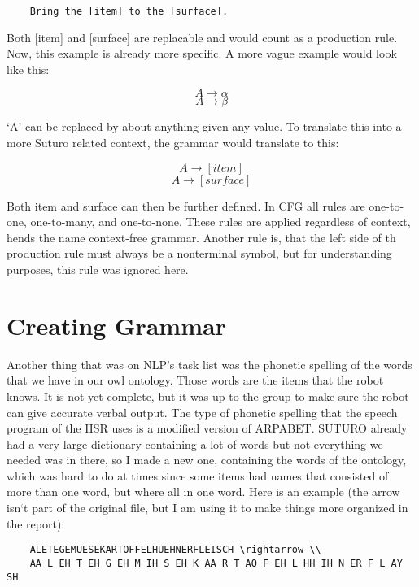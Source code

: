 \documentclass[main.tex]{subfiles}
\begin{document}
	\begin{verbatim}
	Bring the [item] to the [surface].
	\end{verbatim}
	
	Both [item] and [surface] are replacable and would count as a production rule. Now, this example is already more specific. A more vague example would look like this:
	
	\begin{equation}
	A \rightarrow \alpha
	\end{equation}
	\begin{equation}
	A \rightarrow \beta
	\end{equation}
	
	‘A’ can be replaced by about anything given any value. To translate this into a more Suturo related context, the grammar would translate to this:
	
	\begin{equation}
	A \rightarrow [item]
	\end{equation}
	\begin{equation}
	A \rightarrow [surface]
	\end{equation}

	Both item and surface can then be further defined. In CFG all rules are one-to-one, one-to-many, and one-to-none. These rules are applied regardless of context, hends the name context-free grammar. Another rule is, that the left side of th production rule must always be a nonterminal symbol, but for understanding purposes, this rule was ignored here.

	\section{Creating Grammar}
	Another thing that was on NLP's task list was the phonetic spelling of the words that we have in our owl ontology. Those words are the items that the robot knows. It is not yet complete, but it was up to the group to make sure the robot can give accurate verbal output. The type of phonetic spelling that the speech program of the HSR uses is a modified version of ARPABET. SUTURO already had a very large dictionary containing a lot of words but not everything we needed was  in there, so I made a new one, containing the words of the ontology, which was hard to do at times since some items had names that consisted of more than one word, but where all in one word. Here is an example (the arrow isn‘t part of the original file, but I am using it to make things more organized in the report):

	\begin{verbatim}
	ALETEGEMUESEKARTOFFELHUEHNERFLEISCH \rightarrow \\
	AA L EH T EH G EH M IH S EH K AA R T AO F EH L HH IH N ER F L AY SH
	\end{verbatim}
		\endgroup
\end{document}
